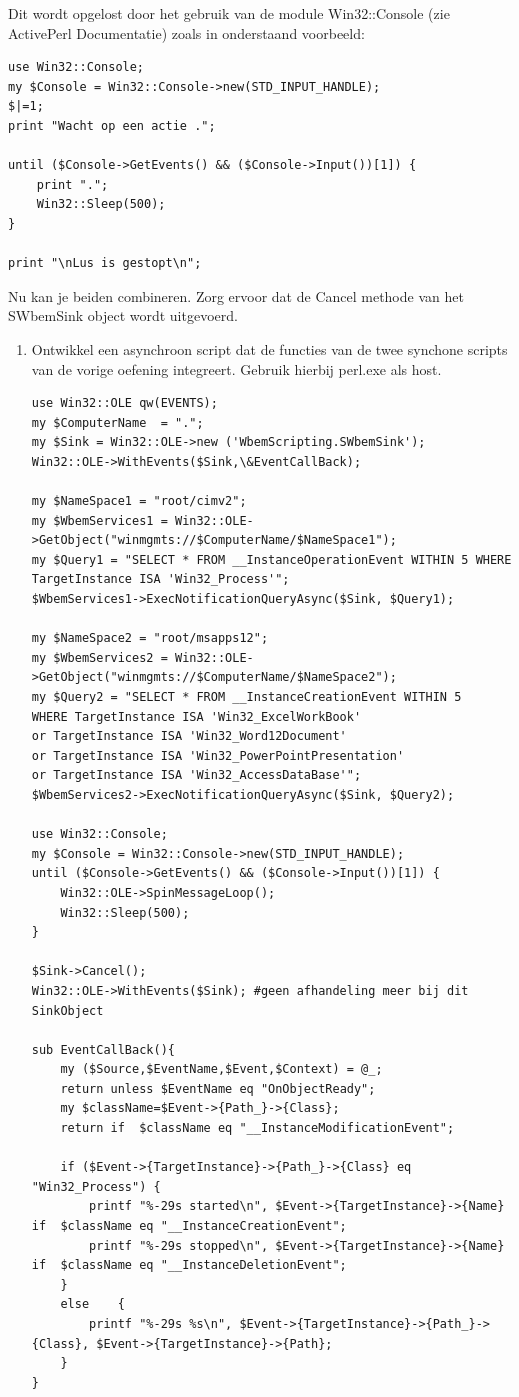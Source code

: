 \documentclass[11pt,a4paper]{report}
\begin{document}
Dit wordt opgelost door het gebruik van de module Win32::Console (zie ActivePerl Documentatie) zoals in onderstaand voorbeeld:
\begin{lstlisting}
use Win32::Console;
my $Console = Win32::Console->new(STD_INPUT_HANDLE);
$|=1; 
print "Wacht op een actie .";

until ($Console->GetEvents() && ($Console->Input())[1]) {
	print ".";
	Win32::Sleep(500);
}

print "\nLus is gestopt\n";
\end{lstlisting}
Nu kan je beiden combineren. Zorg ervoor dat de Cancel methode van het SWbemSink object wordt uitgevoerd.
\begin{enumerate}[resume]
	\item Ontwikkel een asynchroon script dat de functies van de twee synchone scripts van de vorige oefening integreert. Gebruik hierbij perl.exe als host.
	\begin{lstlisting}
use Win32::OLE qw(EVENTS);
my $ComputerName  = ".";
my $Sink = Win32::OLE->new ('WbemScripting.SWbemSink');
Win32::OLE->WithEvents($Sink,\&EventCallBack);

my $NameSpace1 = "root/cimv2";
my $WbemServices1 = Win32::OLE->GetObject("winmgmts://$ComputerName/$NameSpace1");
my $Query1 = "SELECT * FROM __InstanceOperationEvent WITHIN 5 WHERE TargetInstance ISA 'Win32_Process'";
$WbemServices1->ExecNotificationQueryAsync($Sink, $Query1);

my $NameSpace2 = "root/msapps12";
my $WbemServices2 = Win32::OLE->GetObject("winmgmts://$ComputerName/$NameSpace2");
my $Query2 = "SELECT * FROM __InstanceCreationEvent WITHIN 5
WHERE TargetInstance ISA 'Win32_ExcelWorkBook'
or TargetInstance ISA 'Win32_Word12Document'
or TargetInstance ISA 'Win32_PowerPointPresentation'
or TargetInstance ISA 'Win32_AccessDataBase'";
$WbemServices2->ExecNotificationQueryAsync($Sink, $Query2);

use Win32::Console;
my $Console = Win32::Console->new(STD_INPUT_HANDLE);
until ($Console->GetEvents() && ($Console->Input())[1]) {
	Win32::OLE->SpinMessageLoop();
	Win32::Sleep(500);
}

$Sink->Cancel();
Win32::OLE->WithEvents($Sink); #geen afhandeling meer bij dit SinkObject

sub EventCallBack(){
	my ($Source,$EventName,$Event,$Context) = @_;
	return unless $EventName eq "OnObjectReady";
	my $className=$Event->{Path_}->{Class};
	return if  $className eq "__InstanceModificationEvent";
	
	if ($Event->{TargetInstance}->{Path_}->{Class} eq "Win32_Process") {
		printf "%-29s started\n", $Event->{TargetInstance}->{Name} if  $className eq "__InstanceCreationEvent";
		printf "%-29s stopped\n", $Event->{TargetInstance}->{Name} if  $className eq "__InstanceDeletionEvent";
	}
	else	{
		printf "%-29s %s\n", $Event->{TargetInstance}->{Path_}->{Class}, $Event->{TargetInstance}->{Path};
	}
}
	\end{lstlisting}
\end{enumerate}
\end{document}
